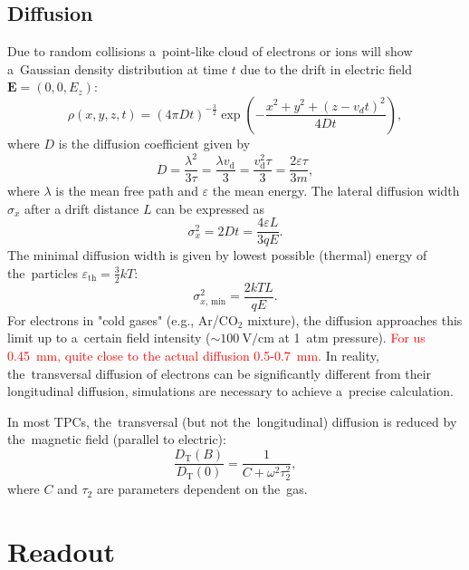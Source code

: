		\subsection{Diffusion}
			Due to random collisions a~point-like cloud of electrons or ions will show a~Gaussian density distribution at time $t$ due to the drift in electric field $\mathbf{E} = (0,0,E_z)$:
				\begin{equation}
					\rho(x,y,z,t) = (4\pi Dt)^{-\frac{3}{2}} \exp\left(-\frac{x^2+y^2+(z-v_dt)^2}{4Dt}\right),
				\end{equation}
			where $D$ is the diffusion coefficient given by
				\begin{equation}
					D = \frac{\lambda^2}{3\tau} = \frac{\lambda v_\text{d}}{3} = \frac{v_\text{d}^2\tau}{3} = \frac{2\varepsilon\tau}{3m},
				\end{equation}
			where $\lambda$ is the mean free path and $\varepsilon$ the mean energy. The lateral diffusion width $\sigma_x$ after a drift distance $L$ can be expressed as
				\begin{equation}
					\sigma_x^2 = 2Dt = \frac{4\varepsilon L}{3qE}.
				\end{equation}
			The minimal diffusion width is given by lowest possible (thermal) energy of the~particles $\varepsilon_\text{th} = \frac{3}{2}kT$:
				\begin{equation}
					\sigma_{x, \,\text{min}}^2 = \frac{2kTL}{qE}.
				\end{equation}
			For electrons in "cold gases" (e.g., Ar/CO$_2$ mixture), the diffusion approaches this limit up to a~certain field intensity ($\sim 100~\text{V}/\text{cm}$ at 1~atm pressure). \textcolor{red}{For us 0.45~mm, quite close to the actual diffusion 0.5-0.7~mm.} In reality, the~transversal diffusion of electrons can be significantly different from their longitudinal diffusion, simulations are necessary to achieve a~precise calculation.
			
			In most \ac{TPC}s, the~transversal (but not the~longitudinal) diffusion is reduced by the~magnetic field (parallel to electric):
				\begin{equation}
					\frac{D_\text{T}(B)}{D_\text{T}(0)} = \frac{1}{C+\omega^2\tau_2^2},
				\end{equation}
			where $C$ and $\tau_2$ are parameters dependent on the~gas.
	
	\section{Readout}
